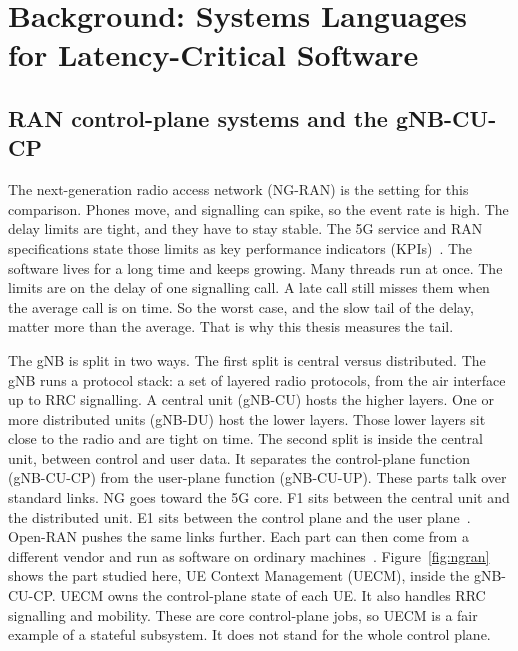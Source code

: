 \documentclass[english,oneside,a4paper,censored,csm,software-track-2020]{HYthesisML}
\begin{document}
\chapter{Background: Systems Languages for Latency-Critical Software\label{chapter:background}}

\section{RAN control-plane systems and the gNB-CU-CP}\label{sec:ranarch}
The next-generation radio access network (NG-RAN) is the setting for this comparison.
Phones move, and signalling can spike, so the event rate is high.
The delay limits are tight, and they have to stay stable.
The 5G service and RAN specifications state those limits as key performance indicators (KPIs)~\cite{3gpp38913,3gpp22261}.
The software lives for a long time and keeps growing. Many threads run at once.
The limits are on the delay of one signalling call.
A late call still misses them when the average call is on time.
So the worst case, and the slow tail of the delay, matter more than the average.
That is why this thesis measures the tail.

The gNB is split in two ways.
The first split is central versus distributed.
The gNB runs a protocol stack: a set of layered radio protocols, from the air interface up to RRC signalling.
A central unit (gNB-CU) hosts the higher layers.
One or more distributed units (gNB-DU) host the lower layers.
Those lower layers sit close to the radio and are tight on time.
The second split is inside the central unit, between control and user data.
It separates the control-plane function (gNB-CU-CP) from the user-plane function (gNB-CU-UP).
These parts talk over standard links.
NG goes toward the 5G core.
F1 sits between the central unit and the distributed unit.
E1 sits between the control plane and the user plane~\cite{3gpp38401,3gpp38300,3gpp38463}.
Open-RAN pushes the same links further.
Each part can then come from a different vendor and run as software on ordinary machines~\cite{polese2023oran}.
Figure~\ref{fig:ngran} shows the part studied here, UE Context Management (UECM), inside the gNB-CU-CP.
UECM owns the control-plane state of each UE.
It also handles RRC signalling and mobility.
These are core control-plane jobs, so UECM is a fair example of a stateful subsystem.
It does not stand for the whole control plane.
\end{document}
